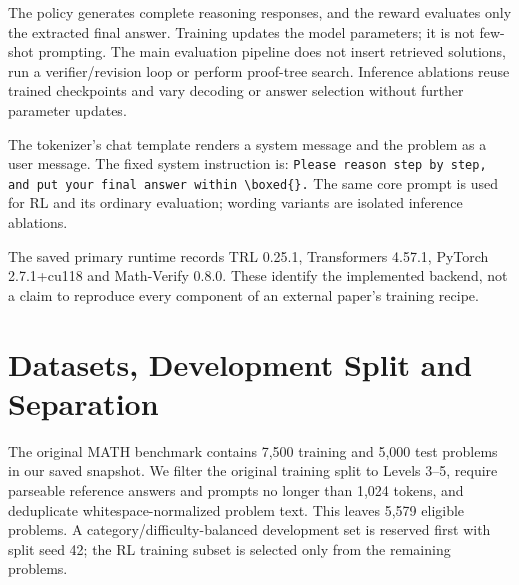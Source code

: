 \documentclass[10pt,letterpaper]{article}
\begin{document}
\begin{center}\end{center}

The policy generates complete reasoning responses, and the reward evaluates only the extracted final answer. Training updates the model parameters; it is not few-shot prompting. The main evaluation pipeline does not insert retrieved solutions, run a verifier/revision loop or perform proof-tree search. Inference ablations reuse trained checkpoints and vary decoding or answer selection without further parameter updates.

The tokenizer's chat template renders a system message and the problem as a user message. The fixed system instruction is: \texttt{Please reason step by step, and put your final answer within \textbackslash boxed\{\}.} The same core prompt is used for RL and its ordinary evaluation; wording variants are isolated inference ablations.

The saved primary runtime records TRL 0.25.1, Transformers 4.57.1, PyTorch 2.7.1+cu118 and Math-Verify 0.8.0. These identify the implemented backend, not a claim to reproduce every component of an external paper's training recipe.

\clearpage

\section{Datasets, Development Split and Separation}

The original MATH benchmark contains 7,500 training and 5,000 test problems in our saved snapshot. We filter the original training split to Levels 3--5, require parseable reference answers and prompts no longer than 1,024 tokens, and deduplicate whitespace-normalized problem text. This leaves 5,579 eligible problems. A category/difficulty-balanced development set is reserved first with split seed 42; the RL training subset is selected only from the remaining problems.
\end{document}
